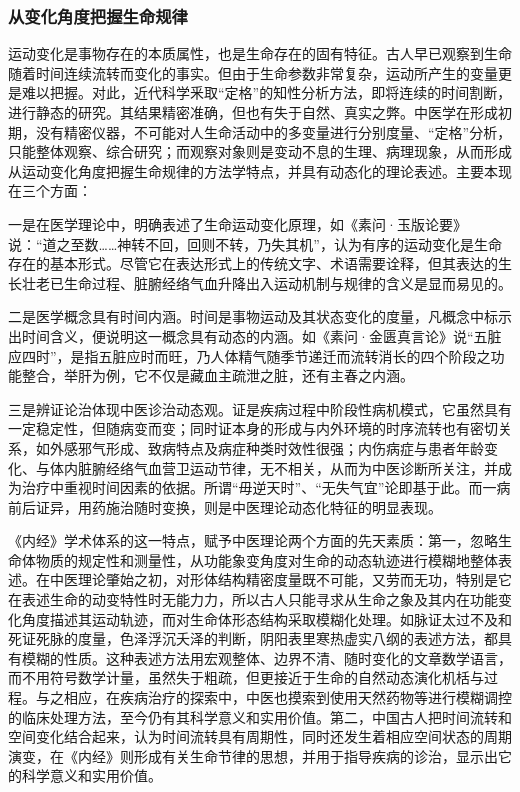 \documentclass[draft,12pt]{ctexbook}
\begin{document}
\subsubsection{从变化角度把握生命规律}%

运动变化是事物存在的本质属性，也是生命存在的固有特征。古人早已观察到生命随着时间连续流转而变化的事实。但由于生命参数非常复杂，运动所产生的变量更是难以把握。对此，近代科学釆取“定格”的知性分析方法，即将连续的时间割断，进行静态的研究。其结果精密准确，但也有失于自然、真实之弊。中医学在形成初期，没有精密仪器，不可能对人生命活动中的多变量进行分别度量、“定格”分析，只能整体观察、综合研究；而观察对象则是变动不息的生理、病理现象，从而形成从运动变化角度把握生命规律的方法学特点，并具有动态化的理论表述。主要本现在三个方面：

一是在医学理论中，明确表述了生命运动变化原理，如《素问·玉版论要》说：“道之至数……神转不回，回则不转，乃失其机”，认为有序的运动变化是生命存在的基本形式。尽管它在表达形式上的传统文字、术语需要诠释，但其表达的生长壮老已生命过程、脏腑经络气血升降出入运动机制与规律的含义是显而易见的。

二是医学概念具有时间内涵。时间是事物运动及其状态变化的度量，凡概念中标示出时间含义，便说明这一概念具有动态的内涵。如《素问·金匮真言论》说“五脏应四时”，是指五脏应时而旺，乃人体精气随季节递迁而流转消长的四个阶段之功能整合，举肝为例，它不仅是藏血主疏泄之脏，还有主春之内涵。

三是辨证论治体现中医诊治动态观。证是疾病过程中阶段性病机模式，它虽然具有一定稳定性，但随病变而变；同时证本身的形成与内外环境的时序流转也有密切关系，如外感邪气形成、致病特点及病症种类时效性很强；内伤病症与患者年龄变化、与体内脏腑经络气血营卫运动节律，无不相关，从而为中医诊断所关注，并成为治疗中重视时间因素的依据。所谓“毋逆天时”、“无失气宜”论即基于此。而一病前后证异，用药施治随时变换，则是中医理论动态化特征的明显表现。

《内经》学术体系的这一特点，赋予中医理论两个方面的先天素质：第一，忽略生命体物质的规定性和测量性，从功能象变角度对生命的动态轨迹进行模糊地整体表述。在中医理论肇始之初，对形体结构精密度量既不可能，又劳而无功，特别是它在表述生命的动变特性时无能力力，所以古人只能寻求从生命之象及其内在功能变化角度描述其运动轨迹，而对生命体形态结构采取模糊化处理。如脉证太过不及和死证死脉的度量，色泽浮沉夭泽的判断，阴阳表里寒热虚实八纲的表述方法，都具有模糊的性质。这种表述方法用宏观整体、边界不清、随时变化的文章数学语言，而不用符号数学计量，虽然失于粗疏，但更接近于生命的自然动态演化机栝与过程。与之相应，在疾病治疗的探索中，中医也摸索到使用天然药物等进行模糊调控的临床处理方法，至今仍有其科学意义和实用价值。第二，中国古人把时间流转和空间变化结合起来，认为时间流转具有周期性，同时还发生着相应空间状态的周期演变，在《内经》则形成有关生命节律的思想，并用于指导疾病的诊治，显示出它的科学意义和实用价值。
\end{document}
